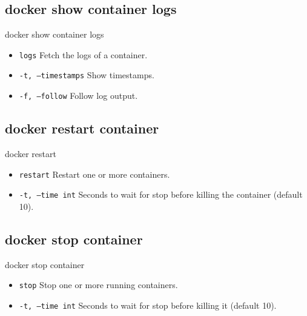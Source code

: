 \subsection{docker show container logs}\label{subsec:docker-show-container-logs}
\begin{frame}{docker show container logs}
    \begin{itemize}
        \item \texttt{logs} Fetch the logs of a container.
        \item \texttt{-t, --timestamps} Show timestamps.
        \item \texttt{-f, --follow} Follow log output.
        
    \end{itemize}
\end{frame}

\subsection{docker restart container}\label{subsec:docker-restart-container}
\begin{frame}{docker restart}
    \begin{itemize}
        \item \texttt{restart} Restart one or more containers.
        \item \texttt{-t, --time int} Seconds to wait for stop before killing the container (default 10).
        
    \end{itemize}
\end{frame}

\subsection{docker stop container}\label{subsec:docker-stop-container}
\begin{frame}{docker stop container}
    \begin{itemize}
        \item \texttt{stop} Stop one or more running containers.
        \item \texttt{-t, --time int} Seconds to wait for stop before killing it (default 10).
        
    \end{itemize}
\end{frame}

